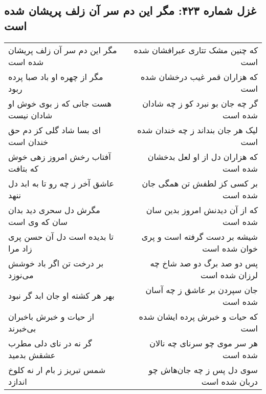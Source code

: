 \begin{center}
\section*{غزل شماره ۴۲۳: مگر این دم سر آن زلف پریشان شده است}
\label{sec:0423}
\begin{longtable}{l p{0.5cm} r}
مگر این دم سر آن زلف پریشان شده است
&&
که چنین مشک تتاری عبرافشان شده است
\\
مگر از چهره او باد صبا پرده ربود
&&
که هزاران قمر غیب درخشان شده است
\\
هست جانی که ز بوی خوش او شادان نیست
&&
گر چه جان بو نبرد کو ز چه شادان شده است
\\
ای بسا شاد گلی کز دم حق خندان است
&&
لیک هر جان بنداند ز چه خندان شده است
\\
آفتاب رخش امروز زهی خوش که بتافت
&&
که هزاران دل از او لعل بدخشان شده است
\\
عاشق آخر ز چه رو تا به ابد دل ننهد
&&
بر کسی کز لطفش تن همگی جان شده است
\\
مگرش دل سحری دید بدان سان که وی است
&&
که از آن دیدنش امروز بدین سان شده است
\\
تا بدیده است دل آن حسن پری زاد مرا
&&
شیشه بر دست گرفته است و پری خوان شده است
\\
بر درخت تن اگر باد خوشش می‌نوزد
&&
پس دو صد برگ دو صد شاخ چه لرزان شده است
\\
بهر هر کشته او جان ابد گر نبود
&&
جان سپردن بر عاشق ز چه آسان شده است
\\
از حیات و خبرش باخبران بی‌خبرند
&&
که حیات و خبرش پرده ایشان شده است
\\
گر نه در نای دلی مطرب عشقش بدمید
&&
هر سر موی چو سرنای چه نالان شده است
\\
شمس تبریز ز بام ار نه کلوخ اندازد
&&
سوی دل پس ز چه جان‌هاش چو دربان شده است
\\
\end{longtable}
\end{center}
